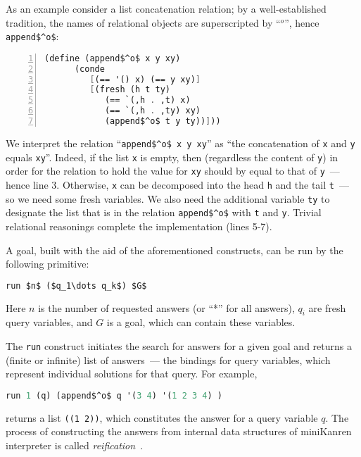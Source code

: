 As an example consider a list concatenation relation; by a well-established tradition, the names
of relational objects are superscripted by ``$^o$'', hence \lstinline{append$^o$}:

\begin{lstlisting}[mathescape=true,language=scheme,numbers=left,numberstyle=\small,stepnumber=1,numbersep=-5pt]
   (define (append$^o$ x y xy)
      (conde
         [(== '() x) (== y xy)]
         [(fresh (h t ty)
            (== `(,h . ,t) x)
            (== `(,h . ,ty) xy)
            (append$^o$ t y ty))]))
\end{lstlisting}

We interpret the relation ``\lstinline{append$^o$ x y xy}'' as ``the concatenation of \lstinline{x} and \lstinline{y}
equals \lstinline{xy}''. Indeed, if the list \lstinline{x} is empty, then (regardless the content of \lstinline{y}) in order for the relation to hold
the value for \lstinline{xy} should by equal to that of \lstinline{y}~--- hence line 3. Otherwise, \lstinline{x} can be decomposed into the head
\lstinline{h} and the tail \lstinline{t}~--- so we need some fresh variables. We also need the additional variable \lstinline{ty} to designate the list
that is in the relation \lstinline{append$^o$} with \lstinline{t} and \lstinline{y}. Trivial relational reasonings complete the implementation (lines 5-7).

A goal, built with the aid of the aforementioned constructs, can be run by the following primitive:

\begin{lstlisting}[mathescape=true,language=scheme]
   run $n$ ($q_1\dots q_k$) $G$
\end{lstlisting}

Here $n$ is the number of requested answers (or ``*'' for all answers), $q_i$ are fresh query variables, and $G$ is a goal, which can
contain these variables.

The \lstinline{run} construct initiates the search for answers for a given goal and returns a (finite or infinite) list
of answers~--- the bindings for query variables, which represent individual solutions for that query. For example,

\begin{lstlisting}[mathescape=true,language=scheme]
   run 1 (q) (append$^o$ q '(3 4) '(1 2 3 4) )
\end{lstlisting}

\noindent returns a list \lstinline{((1 2))}, which constitutes the answer for a query variable $q$. The process of constructing
the answers from internal data structures of miniKanren interpreter is called \emph{reification}~\cite{WillThesis}.

